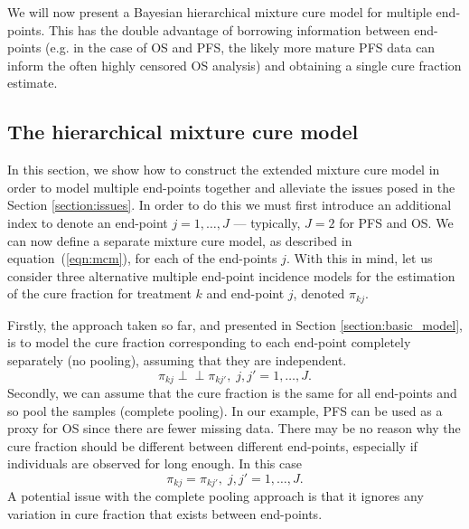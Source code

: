 \documentclass[AMA,STIX1COL]{WileyNJD-v2}
\begin{document}
We will now present a Bayesian hierarchical mixture cure model for multiple end-points.
This has the double advantage of borrowing information between end-points
(e.g. in the case of OS and PFS, the likely more mature PFS data can inform the often highly censored OS analysis) and obtaining a single cure fraction estimate.

%
\subsection{The hierarchical mixture cure model} \label{section:hier_model}
In this section, we show how to construct the extended mixture cure model in order to model multiple end-points together and alleviate the issues posed in the Section \ref{section:issues}.
In order to do this we must first introduce an additional index to denote an end-point $j = 1, \ldots, J$ --- typically, $J=2$ for PFS and OS.
We can now define a separate mixture cure model, as described in equation~(\ref{eqn:mcm}), for each of the end-points $j$.
With this in mind, let us consider three alternative multiple end-point incidence models for the estimation of the cure fraction for treatment $k$ and end-point $j$, denoted $\pi_{kj}$.

Firstly, the approach taken so far, and presented in Section \ref{section:basic_model}, is to model the cure fraction corresponding to each end-point completely separately (no pooling), assuming that they are independent.
$$
\pi_{kj} \perp\!\!\!\perp \pi_{kj'}, \; j,j' = 1, \ldots, J.
$$
Secondly, we can assume that the cure fraction is the same for all end-points and so pool the samples (complete pooling).
In our example, PFS can be used as a proxy for OS since there are fewer missing data.
There may be no reason why the cure fraction should be different between different end-points, especially if individuals are observed for long enough.
In this case
$$
\pi_{kj} = \pi_{kj'}, \; j,j' = 1, \ldots, J.
$$
A potential issue with the complete pooling approach is that it ignores any variation in cure fraction that exists between end-points.
\end{document}
